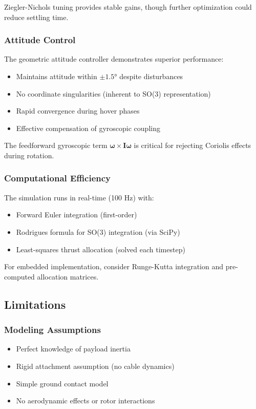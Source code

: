 \documentclass[12pt,a4paper]{article}
\begin{document}
Ziegler-Nichols tuning provides stable gains, though further optimization could reduce settling time.

\subsubsection{Attitude Control}
The geometric attitude controller demonstrates superior performance:
\begin{itemize}
    \item Maintains attitude within $\pm 1.5°$ despite disturbances
    \item No coordinate singularities (inherent to SO(3) representation)
    \item Rapid convergence during hover phases
    \item Effective compensation of gyroscopic coupling
\end{itemize}

The feedforward gyroscopic term $\boldsymbol{\omega} \times \mathbf{I}\boldsymbol{\omega}$ is critical for rejecting Coriolis effects during rotation.

\subsubsection{Computational Efficiency}
The simulation runs in real-time (100 Hz) with:
\begin{itemize}
    \item Forward Euler integration (first-order)
    \item Rodrigues formula for SO(3) integration (via SciPy)
    \item Least-squares thrust allocation (solved each timestep)
\end{itemize}

For embedded implementation, consider Runge-Kutta integration and pre-computed allocation matrices.

\subsection{Limitations}

\subsubsection{Modeling Assumptions}
\begin{itemize}
    \item Perfect knowledge of payload inertia
    \item Rigid attachment assumption (no cable dynamics)
    \item Simple ground contact model
    \item No aerodynamic effects or rotor interactions
\end{itemize}
\end{document}
